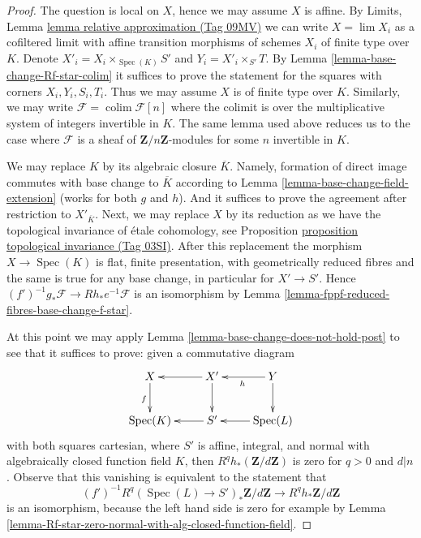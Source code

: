 \documentclass{amsart}
\theoremstyle{plain}
\theoremstyle{definition}
\theoremstyle{remark}
\numberwithin{equation}{subsection}
\def\lim{\mathop{\mathrm{lim}}\nolimits}
\def\colim{\mathop{\mathrm{colim}}\nolimits}
\def\Spec{\mathop{\mathrm{Spec}}}
\begin{document}
\begin{proof}
The question is local on $X$, hence we may assume $X$ is affine.
By Limits, Lemma \href{https://stacks.math.columbia.edu/tag/09MV}{lemma relative approximation (Tag 09MV)}
we can write $X = \lim X_i$ as a cofiltered limit with affine
transition morphisms of schemes $X_i$ of finite type over $K$.
Denote $X'_i =  X_i \times_{\Spec(K)} S'$ and $Y_i = X'_i \times_{S'} T$.
By Lemma \ref{lemma-base-change-Rf-star-colim}
it suffices to prove the statement for the squares
with corners $X_i, Y_i, S_i, T_i$.
Thus we may assume $X$ is of finite type over $K$.
Similarly, we may write
$\mathcal{F} = \colim \mathcal{F}[n]$ where the colimit
is over the multiplicative system of integers invertible in $K$.
The same lemma used above reduces us to the case where
$\mathcal{F}$ is a sheaf of $\mathbf{Z}/n\mathbf{Z}$-modules
for some $n$ invertible in $K$.

\medskip\noindent
We may replace $K$ by its algebraic closure $\overline{K}$.
Namely, formation of direct image commutes with base change
to $\overline{K}$ according to
Lemma \ref{lemma-base-change-field-extension} (works for both
$g$ and $h$). And it suffices to prove the agreement after
restriction to $X'_{\overline{K}}$. Next, we may replace
$X$ by its reduction as we have the topological invariance of \'etale
cohomology, see
Proposition \href{https://stacks.math.columbia.edu/tag/03SI}{proposition topological invariance (Tag 03SI)}.
After this replacement the morphism $X \to \Spec(K)$
is flat, finite presentation, with geometrically reduced fibres
and the same is true for any base change, in particular for $X' \to S'$.
Hence $(f')^{-1}g_*\mathcal{F} \to Rh_*e^{-1}\mathcal{F}$
is an isomorphism by Lemma \ref{lemma-fppf-reduced-fibres-base-change-f-star}.

\medskip\noindent
At this point we may apply
Lemma \ref{lemma-base-change-does-not-hold-post}
to see that it suffices to prove: given a commutative diagram
$$
\xymatrix{
X \ar[d]_f & X' \ar[d] \ar[l] & Y \ar[l]^h \ar[d] \\
\Spec(K) & S' \ar[l] & \Spec(L) \ar[l]
}
$$
with both squares cartesian, where $S'$ is affine, integral, and normal
with algebraically closed function field $K$, then
$R^qh_*(\mathbf{Z}/d\mathbf{Z})$ is zero for $q > 0$ and $d | n$.
Observe that this vanishing is equivalent to the statement that
$$
(f')^{-1}R^q(\Spec(L) \to S')_*\mathbf{Z}/d\mathbf{Z}
\longrightarrow
R^qh_*\mathbf{Z}/d\mathbf{Z}
$$
is an isomorphism, because the left hand side is zero for example by
Lemma \ref{lemma-Rf-star-zero-normal-with-alg-closed-function-field}.


\end{proof}
\end{document}
